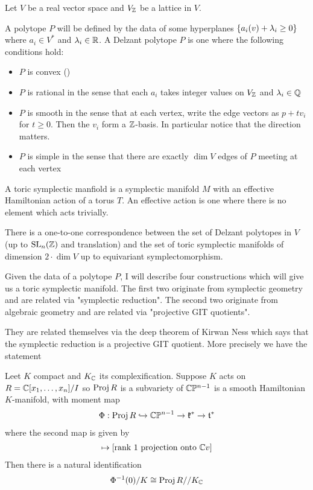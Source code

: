 \documentclass[12pt]{article}
\begin{document}
Let $V$ be a real vector space and $V_{\mathbb{Z}}$ be a lattice in $V$.

\hfill

A polytope $P$ will be defined by the data of some hyperplanes $\{a_i(v) + \lambda_i\geq 0\}$
where $a_i\in V^*$ and $\lambda_i\in\mathbb{R}$. A Delzant polytope $P$ is one where the following
conditions hold: \begin{itemize}
	\item $P$ is convex ()
	\item $P$ is rational in the sense that each $a_i$ takes integer values on $V_{\mathbb{Z}}$ and $\lambda_i\in\mathbb{Q}$
	\item $P$ is smooth in the sense that at each vertex, write the edge vectors as $p + tv_i$ for $t\geq 0$.
	      Then the $v_i$ form a $\mathbb{Z}$-basis. In particular notice that the direction matters.
	\item $P$ is simple in the sense that there are exactly $\dim V$ edges of $P$ meeting at each vertex
\end{itemize}

A toric symplectic manfiold is a symplectic manifold $M$ with an effective Hamiltonian action of a torus $T$.
An effective action is one where there is no element which acts trivially.

\begin{theorem}
	[Delzant] There is a one-to-one correspondence between the set of Delzant polytopes in $V$ (up to
	$\operatorname{SL}_n(\mathbb{Z})$ and translation) and the set of
	toric symplectic manifolds of dimension $2\cdot \dim V$ up to equivariant symplectomorphism.
\end{theorem}

Given the data of a polytope $P$, I will describe four constructions
which will give us a toric symplectic manifold. The first two originate from
symplectic geometry and are related via "symplectic reduction". The second two
originate from algebraic geometry and are related via "projective GIT quotients".

\hfill

They are related themselves via the deep theorem of Kirwan Ness which says that
the symplectic reduction is a projective GIT quotient. More precisely we have the statement

\begin{theorem}
	 Leet $K$ compact and $K_{\mathbb{C}}$ its complexification.
	Suppose $K$ acts on $R = \mathbb{C}[x_1,\dots,x_n]/I$ so $\operatorname{Proj} R$ is a subvariety of $\mathbb{C}\mathbb{P}^{n-1}$
	is a smooth Hamiltonian $K$-manifold, with moment map \begin{align*}
		\Phi:\operatorname{Proj} R \hookrightarrow \mathbb{C}\mathbb{P}^{n-1} \to \mathfrak{k}^* \to \mathfrak{t}^*
	\end{align*}
	where the second map is given by \begin{align*}
		[v] \mapsto [\text{rank 1 projection onto $\C v$}]
	\end{align*}
	Then there is a natural identification \begin{align*}
		\Phi^{-1}(0)/K \cong \operatorname{Proj} R // K_{\mathbb{C}}
	\end{align*}
\end{theorem}
\end{document}
